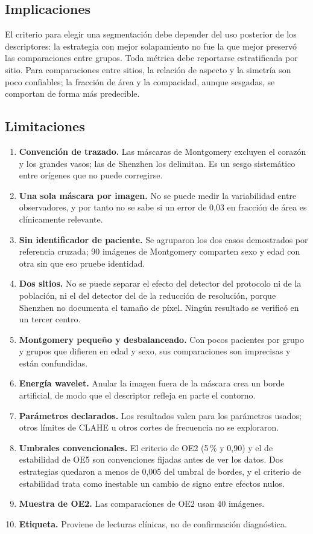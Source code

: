 \subsection{Implicaciones}

El criterio para elegir una segmentación debe depender del uso posterior de los
descriptores: la estrategia con mejor solapamiento no fue la que mejor preservó las
comparaciones entre grupos. Toda métrica debe reportarse estratificada por sitio.
Para comparaciones entre sitios, la relación de aspecto y la simetría son poco
confiables; la fracción de área y la compacidad, aunque sesgadas, se comportan de
forma más predecible.

\subsection{Limitaciones}

\begin{enumerate}
    \item \textbf{Convención de trazado.} Las máscaras de Montgomery excluyen el
    corazón y los grandes vasos; las de Shenzhen los delimitan. Es un sesgo
    sistemático entre orígenes que no puede corregirse.
    \item \textbf{Una sola máscara por imagen.} No se puede medir la variabilidad
    entre observadores, y por tanto no se sabe si un error de 0,03 en fracción de
    área es clínicamente relevante.
    \item \textbf{Sin identificador de paciente.} Se agruparon los dos casos
    demostrados por referencia cruzada; 90 imágenes de Montgomery comparten sexo y
    edad con otra sin que eso pruebe identidad.
    \item \textbf{Dos sitios.} No se puede separar el efecto del detector del
    protocolo ni de la población, ni el del detector del de la reducción de
    resolución, porque Shenzhen no documenta el tamaño de píxel. Ningún resultado
    se verificó en un tercer centro.
    \item \textbf{Montgomery pequeño y desbalanceado.} Con pocos pacientes por grupo y
    grupos que difieren en edad y sexo, sus comparaciones son imprecisas y están
    confundidas.
    \item \textbf{Energía wavelet.} Anular la imagen fuera de la máscara crea un
    borde artificial, de modo que el descriptor refleja en parte el contorno.
    \item \textbf{Parámetros declarados.} Los resultados valen para los parámetros
    usados; otros límites de CLAHE u otros cortes de frecuencia no se exploraron.
    \item \textbf{Umbrales convencionales.} El criterio de OE2 (5\,\% y 0,90) y el de
    estabilidad de OE5 son convenciones fijadas antes de ver los datos. Dos
    estrategias quedaron a menos de 0,005 del umbral de bordes, y el criterio de
    estabilidad trata como inestable un cambio de signo entre efectos nulos.
    \item \textbf{Muestra de OE2.} Las comparaciones de OE2 usan 40 imágenes.
    \item \textbf{Etiqueta.} Proviene de lecturas clínicas, no de confirmación
    diagnóstica.
\end{enumerate}

